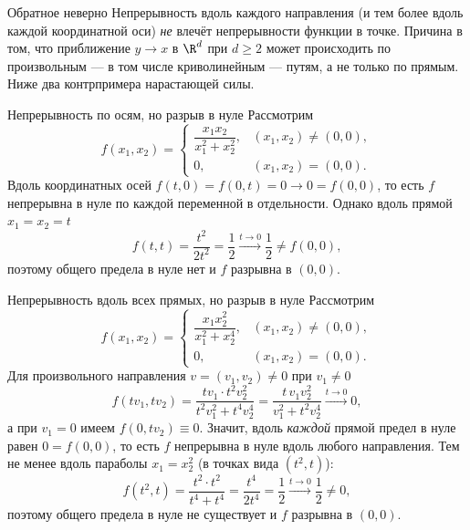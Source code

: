 \begin{Remark}{Обратное неверно}{}
	Непрерывность вдоль каждого направления (и тем более вдоль каждой координатной оси) \emph{не} влечёт непрерывности функции в точке. Причина в том, что приближение $y\to x$ в $\R^d$ при $d\ge2$ может происходить по произвольным --- в том числе криволинейным --- путям, а не только по прямым. Ниже два контрпримера нарастающей силы.
\end{Remark}

\begin{Example}{Непрерывность по осям, но разрыв в нуле}{}
	Рассмотрим
	\[
	f(x_1,x_2)=
	\begin{cases}
		\dfrac{x_1 x_2}{x_1^2+x_2^2}, & (x_1,x_2)\ne(0,0),\\[6pt]
		0, & (x_1,x_2)=(0,0).
	\end{cases}
	\]
	Вдоль координатных осей $f(t,0)=f(0,t)=0\to0=f(0,0)$, то есть $f$ непрерывна в нуле по каждой переменной в отдельности. Однако вдоль прямой $x_1=x_2=t$
	\[
	f(t,t)=\frac{t^2}{2t^2}=\frac12\xrightarrow{t\to0}\frac12\ne f(0,0),
	\]
	поэтому общего предела в нуле нет и $f$ разрывна в $(0,0)$.
\end{Example}

\begin{Example}{Непрерывность вдоль всех прямых, но разрыв в нуле}{}
	Рассмотрим
	\[
	f(x_1,x_2)=
	\begin{cases}
		\dfrac{x_1 x_2^2}{x_1^2+x_2^4}, & (x_1,x_2)\ne(0,0),\\[6pt]
		0, & (x_1,x_2)=(0,0).
	\end{cases}
	\]
	Для произвольного направления $v=(v_1,v_2)\ne0$ при $v_1\ne0$
	\[
	f(tv_1,tv_2)=\frac{t v_1\cdot t^2 v_2^2}{t^2 v_1^2+t^4 v_2^4}
	=\frac{t\,v_1 v_2^2}{v_1^2+t^2 v_2^4}\xrightarrow{t\to0}0,
	\]
	а при $v_1=0$ имеем $f(0,tv_2)\equiv0$. Значит, вдоль \emph{каждой} прямой предел в нуле равен $0=f(0,0)$, то есть $f$ непрерывна в нуле вдоль любого направления. Тем не менее вдоль параболы $x_1=x_2^2$ (в точках вида $(t^2,t)$):
	\[
	f(t^2,t)=\frac{t^2\cdot t^2}{t^4+t^4}=\frac{t^4}{2t^4}=\frac12\xrightarrow{t\to0}\frac12\ne0,
	\]
	поэтому общего предела в нуле не существует и $f$ разрывна в $(0,0)$.
\end{Example}

